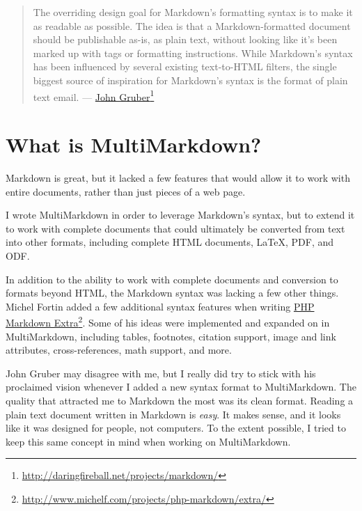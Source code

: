 \begin{quote}
The overriding design goal for Markdown's formatting syntax is to
make it as readable as possible. The idea is that a Markdown-formatted
document should be publishable as-is, as plain text, without looking
like it's been marked up with tags or formatting instructions. While
Markdown's syntax has been influenced by several existing
text-to-HTML filters, the single biggest source of inspiration for
Markdown's syntax is the format of plain text email. --- \href{http://daringfireball.net/projects/markdown/}{John Gruber}\footnote{\href{http://daringfireball.net/projects/markdown/}{http:\slash{}\slash{}daringfireball.net\slash{}projects\slash{}markdown\slash{}}}
\end{quote}

\section{What is MultiMarkdown?}
\label{whatismultimarkdown}

Markdown is great, but it lacked a few features that would allow it to work with entire documents, rather than just pieces of a web page.

I wrote MultiMarkdown in order to leverage Markdown's syntax, but to extend it to work with complete documents that could ultimately be converted from text into other formats, including complete HTML documents, LaTeX, PDF, and ODF.

In addition to the ability to work with complete documents and conversion to formats beyond HTML, the Markdown syntax was lacking a few other things. Michel Fortin added a few additional syntax features when writing \href{http://www.michelf.com/projects/php-markdown/extra/}{PHP Markdown Extra}\footnote{\href{http://www.michelf.com/projects/php-markdown/extra/}{http:\slash{}\slash{}www.michelf.com\slash{}projects\slash{}php-markdown\slash{}extra\slash{}}}. Some of his ideas were implemented and expanded on in MultiMarkdown, including tables, footnotes, citation support, image and link attributes, cross-references, math support, and more.

John Gruber may disagree with me, but I really did try to stick with his proclaimed vision whenever I added a new syntax format to MultiMarkdown. The quality that attracted me to Markdown the most was its clean format. Reading a plain text document written in Markdown is \emph{easy}. It makes sense, and it looks like it was designed for people, not computers. To the extent possible, I tried to keep this same concept in mind when working on MultiMarkdown.

